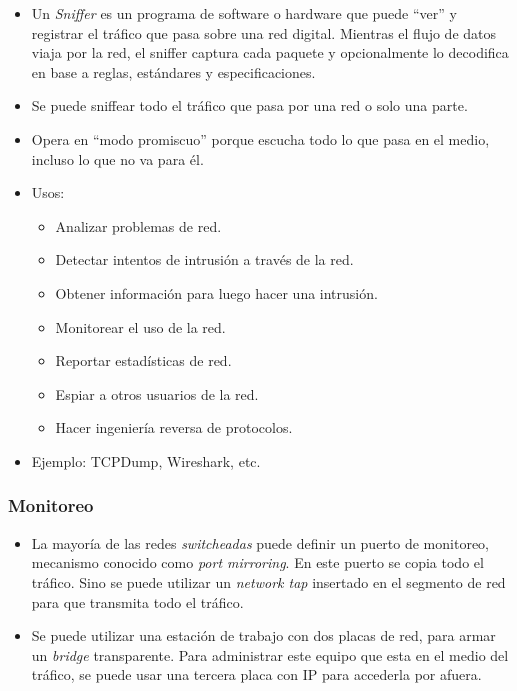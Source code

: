 \begin{itemize}
	\item Un \textit{Sniffer} es un programa de software o hardware que puede ``ver'' y registrar
	el tráfico que pasa sobre una red digital. Mientras el flujo de datos viaja por la red, el
	sniffer captura cada paquete y opcionalmente lo decodifica en base a reglas, estándares y
	especificaciones.
	\item Se puede sniffear todo el tráfico que pasa por una red o solo una parte.
	\item Opera en ``modo promiscuo'' porque escucha todo lo que pasa en el medio, incluso lo que
	no va para él.
	\item Usos:
		\begin{itemize}
			\item Analizar problemas de red.
			\item Detectar intentos de intrusión a través de la red.
			\item Obtener información para luego hacer una intrusión.
			\item Monitorear el uso de la red.
			\item Reportar estadísticas de red.
			\item Espiar a otros usuarios de la red.
			\item Hacer ingeniería reversa de protocolos.
		\end{itemize}
	\item Ejemplo: TCPDump, Wireshark, etc.
\end{itemize}

\subsubsection{Monitoreo}

\begin{itemize}
	\item La mayoría de las redes \textit{switcheadas} puede definir un puerto de monitoreo, mecanismo
	conocido como \textit{port mirroring}. En este puerto se copia todo el tráfico. Sino se puede utilizar
	un \textit{network tap} insertado en el segmento de red para que transmita todo el tráfico.
	\item Se puede utilizar una estación de trabajo con dos placas de red, para armar un \textit{bridge}
	transparente. Para administrar este equipo que esta en el medio del tráfico, se puede usar una tercera
	placa con IP para accederla por afuera.
\end{itemize}

